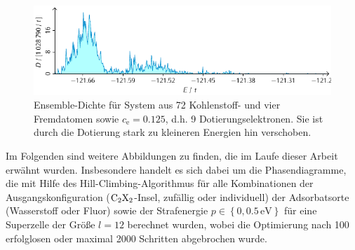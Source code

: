 \documentclass[a4paper, 10pt, twoside, openany]{book} %
\newcommand \braces[1]{\left \lbrace #1 \right \rbrace}
\def \cE {c_\mathrm{e}}
\begin{document}
	\begin{figure}
		\includegraphics[width=\textwidth]{Abbildungen/Zustandsdichten/84.pdf}
		\caption[Ensemble-Dichte mit Dotierung]{Ensemble-Dichte für System aus 72 Kohlenstoff- und vier Fremdatomen sowie $\cE = 0.125$, d.h. 9 Dotierungselektronen. Sie ist durch die Dotierung stark zu kleineren Energien hin verschoben.}
		\label{Phasenvolumen2}
	\end{figure}
	Im Folgenden sind weitere Abbildungen zu finden, die im Laufe dieser Arbeit erwähnt wurden. Insbesondere handelt es sich dabei um die Phasendiagramme, die mit Hilfe des Hill-Climbing-Algorithmus für alle Kombinationen der Ausgangskonfiguration ($\rm C_2X_2$-Insel, zufällig oder individuell) der Adsorbatsorte (Wasserstoff oder Fluor) sowie der Strafenergie $p \in \braces{0, 0.5\,\mathrm{eV}}$ für eine Superzelle der Größe $l = 12$ berechnet wurden, wobei die Optimierung nach 100 erfolglosen oder maximal 2000 Schritten abgebrochen wurde.
	
\end{document}
